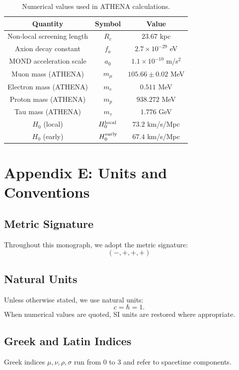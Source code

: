 \documentclass[12pt,oneside]{book}
\begin{document}
\begin{table}[H]
\centering
\begin{tabular}{|c|c|c|}
\hline
\textbf{Quantity} & \textbf{Symbol} & \textbf{Value} \\
\hline
Non-local screening length & $R_c$ & $23.67$ kpc \\
Axion decay constant & $f_a$ & $2.7 \times 10^{-29}$ eV \\
MOND acceleration scale & $a_0$ & $1.1 \times 10^{-10}$ m/s$^2$ \\
Muon mass (ATHENA) & $m_\mu$ & $105.66 \pm 0.02$ MeV \\
Electron mass (ATHENA) & $m_e$ & $0.511$ MeV \\
Proton mass (ATHENA) & $m_p$ & $938.272$ MeV \\
Tau mass (ATHENA) & $m_\tau$ & $1.776$ GeV \\
$H_0$ (local) & $H_0^{\rm local}$ & $73.2$ km/s/Mpc \\
$H_0$ (early) & $H_0^{\rm early}$ & $67.4$ km/s/Mpc \\
\hline
\end{tabular}
\caption{Numerical values used in ATHENA calculations.}
\end{table}

\chapter{Appendix E: Units and Conventions}

\section{Metric Signature}

Throughout this monograph, we adopt the metric signature:
\[
(-, +, +, +)
\]

\section{Natural Units}

Unless otherwise stated, we use natural units:
\[
c = \hbar = 1.
\]
When numerical values are quoted, SI units are restored where appropriate.

\section{Greek and Latin Indices}

Greek indices $\mu, \nu, \rho, \sigma$ run from 0 to 3 and refer to spacetime components.
\end{document}
